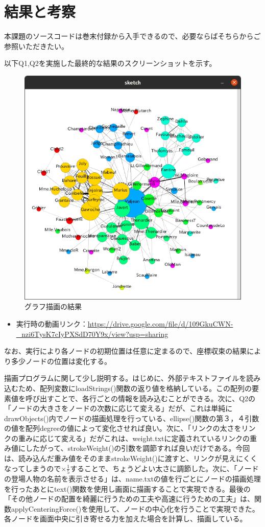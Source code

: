 \documentclass[dvipdfmx]{jsarticle}
\begin{document}
\section{結果と考察}
本課題のソースコードは巻末付録から入手できるので、必要ならばそちらからご参照いただきたい。\par
以下Q1,Q2を実施した最終的な結果のスクリーンショットを示す。
\begin{figure}[H]
  \centering
  \includegraphics[scale=0.4]{images/result.png}
  \caption{グラフ描画の結果}
\end{figure}
\begin{itemize}
  \item 実行時の動画リンク：\url{https://drive.google.com/file/d/109GkuCWN-_nzi6TysK7cIyPXSdD70Y9x/view?usp=sharing}
\end{itemize}
なお、実行により各ノードの初期位置は任意に定まるので、座標収束の結果により多少ノードの位置は変化する。\par
描画プログラムに関して少し説明する。はじめに、外部テキストファイルを読み込むため、配列変数にloadStrings()関数の返り値を格納している。この配列の要素値を呼び出すことで、各行ごとの情報を読み込むことができる。次に、Q2の「ノードの大きさをノードの次数に応じて変える」だが、これは単純にdrawObjects()内でノードの描画処理を行っている、ellipse()関数の第３，４引数の値を配列degreeの値によって変化させれば良い。次に、「リンクの太さをリンクの重みに応じて変える」だがこれは、weight.txtに定義されているリンクの重み値にしたがって、strokeWeight()の引数を調節すれば良いだけである。今回は、読み込んだ重み値をそのままstrokeWeight()に渡すと、リンクが見えにくくなってしまうので$\times \frac{1}{5}$することで、ちょうどよい太さに調節した。次に、「ノードの登場人物の名前を表示させる」は、name.txtの値を行ごとにノードの描画処理を行ったあとにtext()関数を使用し画面に描画することで実現できる。最後の「その他ノードの配置を綺麗に行うための工夫や高速に行うための工夫」は、関数applyCenteringForce()を使用して、ノードの中心化を行うことで実現できた。各ノードを画面中央に引き寄せる力を加えた場合を計算し、描画している。\par
\end{document}
